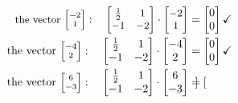 \begin{align*}
\small
\textrm{the vector }
{\scriptsize
\begin{bmatrix}
-2 \\ 1 \\
\end{bmatrix}}: \quad
\begin{bmatrix}
\frac{1}{2} & 1 \\
-1 & -2 \\
\end{bmatrix} \cdot
\begin{bmatrix}
-2 \\ 1 \\
\end{bmatrix} &=
\begin{bmatrix}
0 \\ 0 \\
\end{bmatrix}
\checkmark \\
\textrm{the vector }
{\scriptsize
\begin{bmatrix}
-4 \\ 2 \\
\end{bmatrix}}: \quad
\begin{bmatrix}
\frac{1}{2} & 1 \\
-1 & -2 \\
\end{bmatrix} \cdot
\begin{bmatrix}
-4 \\ 2 \\
\end{bmatrix} &=
\begin{bmatrix}
0 \\ 0 \\
\end{bmatrix}
\checkmark \\
\textrm{the vector }
{\scriptsize
\begin{bmatrix}
6 \\ -3 \\
\end{bmatrix}}: \quad
\begin{bmatrix}
\frac{1}{2} & 1 \\
-1 & -2 \\
\end{bmatrix} \cdot
\begin{bmatrix}
6 \\ -3 \\
\end{bmatrix} &=
\begin{bmatrix}

\end{bmatrix}
\end{align*}
